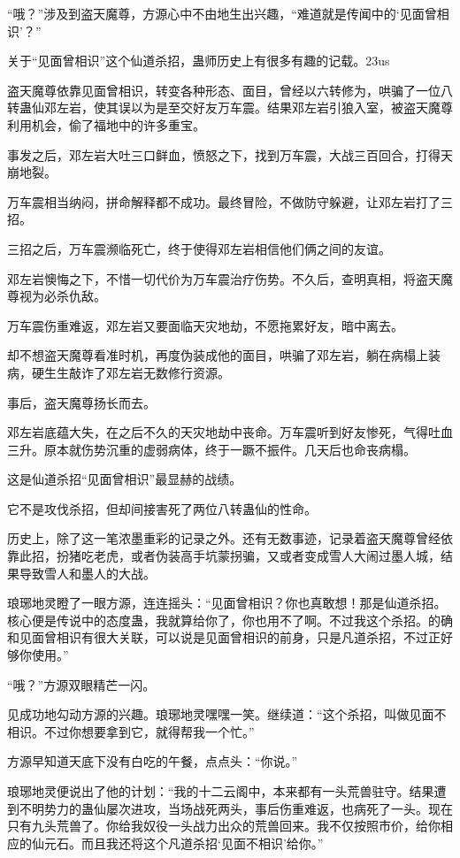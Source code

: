 
\begin{this_body}

“哦？”涉及到盗天魔尊，方源心中不由地生出兴趣，“难道就是传闻中的‘见面曾相识’？”

关于“见面曾相识”这个仙道杀招，蛊师历史上有很多有趣的记载。23us

盗天魔尊依靠见面曾相识，转变各种形态、面目，曾经以六转修为，哄骗了一位八转蛊仙邓左岩，使其误以为是至交好友万车震。结果邓左岩引狼入室，被盗天魔尊利用机会，偷了福地中的许多重宝。

事发之后，邓左岩大吐三口鲜血，愤怒之下，找到万车震，大战三百回合，打得天崩地裂。

万车震相当纳闷，拼命解释都不成功。最终冒险，不做防守躲避，让邓左岩打了三招。

三招之后，万车震濒临死亡，终于使得邓左岩相信他们俩之间的友谊。

邓左岩懊悔之下，不惜一切代价为万车震治疗伤势。不久后，查明真相，将盗天魔尊视为必杀仇敌。

万车震伤重难返，邓左岩又要面临天灾地劫，不愿拖累好友，暗中离去。

却不想盗天魔尊看准时机，再度伪装成他的面目，哄骗了邓左岩，躺在病榻上装病，硬生生敲诈了邓左岩无数修行资源。

事后，盗天魔尊扬长而去。

邓左岩底蕴大失，在之后不久的天灾地劫中丧命。万车震听到好友惨死，气得吐血三升。原本就伤势沉重的虚弱病体，终于一蹶不振件。几天后也命丧病榻。

这是仙道杀招“见面曾相识”最显赫的战绩。

它不是攻伐杀招，但却间接害死了两位八转蛊仙的性命。

历史上，除了这一笔浓墨重彩的记录之外。还有无数事迹，记录着盗天魔尊曾经依靠此招，扮猪吃老虎，或者伪装高手坑蒙拐骗，又或者变成雪人大闹过墨人城，结果导致雪人和墨人的大战。

琅琊地灵瞪了一眼方源，连连摇头：“见面曾相识？你也真敢想！那是仙道杀招。核心便是传说中的态度蛊，我就算给你了，你也用不了啊。不过我这个杀招。的确和见面曾相识有很大关联，可以说是见面曾相识的前身，只是凡道杀招，不过正好够你使用。”

“哦？”方源双眼精芒一闪。

见成功地勾动方源的兴趣。琅琊地灵嘿嘿一笑。继续道：“这个杀招，叫做见面不相识。不过你想要拿到它，就得帮我一个忙。”

方源早知道天底下没有白吃的午餐，点点头：“你说。”

琅琊地灵便说出了他的计划：“我的十二云阁中，本来都有一头荒兽驻守。结果遭到不明势力的蛊仙屡次进攻，当场战死两头，事后伤重难返，也病死了一头。现在只有九头荒兽了。你给我奴役一头战力出众的荒兽回来。我不仅按照市价，给你相应的仙元石。而且我还将这个凡道杀招‘见面不相识’给你。”


\end{this_body}
